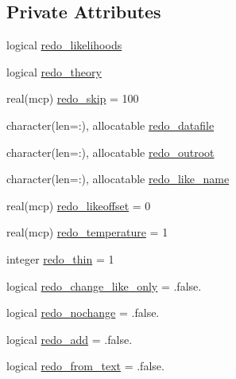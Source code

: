 \subsection*{Private Attributes}
\begin{DoxyCompactItemize}
\item 
logical \mbox{\hyperlink{structimportancesampling_1_1timportancesampler_a52c68d4f1b96631a9f40ee8a0ae01dc9}{redo\+\_\+likelihoods}}
\item 
logical \mbox{\hyperlink{structimportancesampling_1_1timportancesampler_a69060f3953c263c0d2400878abfb1a49}{redo\+\_\+theory}}
\item 
real(mcp) \mbox{\hyperlink{structimportancesampling_1_1timportancesampler_a857cc53c9b9a7ed891c84b7449c0a2f6}{redo\+\_\+skip}} = 100
\item 
character(len=\+:), allocatable \mbox{\hyperlink{structimportancesampling_1_1timportancesampler_a813d3483eb23813919b6cf686703c5d1}{redo\+\_\+datafile}}
\item 
character(len=\+:), allocatable \mbox{\hyperlink{structimportancesampling_1_1timportancesampler_aab50bd71d93cf44c368c375f050c6634}{redo\+\_\+outroot}}
\item 
character(len=\+:), allocatable \mbox{\hyperlink{structimportancesampling_1_1timportancesampler_aa6c74b7f86f0ba6ee504fe4bede40b61}{redo\+\_\+like\+\_\+name}}
\item 
real(mcp) \mbox{\hyperlink{structimportancesampling_1_1timportancesampler_a0e028b142db90a536d370b3259ef7568}{redo\+\_\+likeoffset}} = 0
\item 
real(mcp) \mbox{\hyperlink{structimportancesampling_1_1timportancesampler_a6a27c90271c4663b7144bc24e833400f}{redo\+\_\+temperature}} = 1
\item 
integer \mbox{\hyperlink{structimportancesampling_1_1timportancesampler_afd6ba4435906fa859e4a06529d687d20}{redo\+\_\+thin}} = 1
\item 
logical \mbox{\hyperlink{structimportancesampling_1_1timportancesampler_a53b49fb636469b3b90c334f889965015}{redo\+\_\+change\+\_\+like\+\_\+only}} = .false.
\item 
logical \mbox{\hyperlink{structimportancesampling_1_1timportancesampler_a9e65cbe2a2bb930a8015db74b8f63f2e}{redo\+\_\+nochange}} = .false.
\item 
logical \mbox{\hyperlink{structimportancesampling_1_1timportancesampler_a291e6ba39f0d39650df6cc5dbc434245}{redo\+\_\+add}} = .false.
\item 
logical \mbox{\hyperlink{structimportancesampling_1_1timportancesampler_af4f9ca70f0e44b1f45c06196dc2a57c2}{redo\+\_\+from\+\_\+text}} = .false.

\end{DoxyCompactItemize}
